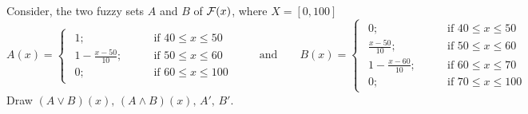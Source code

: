\documentclass[../main-sheet.tex]{subfiles}
\begin{document}
\begin{ex}
    Consider, the two fuzzy sets \(A \) and \(B \) of \(\mathcal{F}(x) \), where \(X=[0,100]\)
    \[
        A(x)=\begin{cases}
            \begin{aligned}
                1; \qquad&\text{if } 40\leq x\leq 50\\
                1-\frac{x-50}{10}; \qquad&\text{if } 50\leq x\leq 60\\
                0; \qquad&\text{if }60\leq x\leq100
            \end{aligned}
    \end{cases}
    \qquad\text{and}\qquad
    B(x)=\begin{cases}
        \begin{aligned}
            0; \qquad&\text{if }40\leq x\leq 50\\
            \frac{x-50}{10} ; \qquad&\text{if }50 \leq x\leq 60\\
            1-\frac{x-60}{10}; \qquad&\text{if }60\leq x\leq 70\\
            0; \qquad&\text{if }70\leq x\leq 100
        \end{aligned}
    \end{cases}
    \]
    Draw \((A\vee B )(x),\,(A\wedge B)(x),\,A',\,B'\).
\end{ex}
\end{document}
